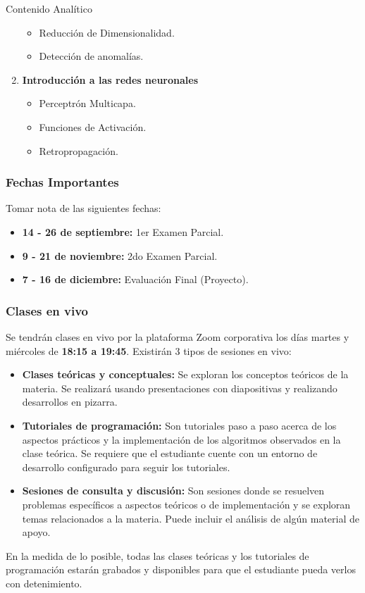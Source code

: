 \documentclass[10pt]{beamer}
\begin{document}
\begin{frame}[allowframebreaks]{Contenido Analítico}
\begin{enumerate}
\begin{itemize}
                \item Reducción de Dimensionalidad.
                \item Detección de anomalías.
            \end{itemize}
        \item  \textbf{Introducción a las redes neuronales}
            \begin{itemize}
                \item Perceptrón Multicapa.
                \item Funciones de Activación.
                \item Retropropagación.
            \end{itemize}
    \end{enumerate}
\end{frame}

\begin{frame}
    \frametitle{Fechas Importantes}
    Tomar nota de las siguientes fechas:
    \begin{itemize}
        \item \alert{\textbf{14 - 26 de septiembre:}} 1er Examen Parcial.
        \item \alert{\textbf{9 - 21 de noviembre:}} 2do Examen Parcial.
        \item \alert{\textbf{7 - 16 de diciembre:}} Evaluación Final (Proyecto).
    \end{itemize}
    

\end{frame}

\begin{frame}
    \frametitle{Clases en vivo}
    Se tendrán clases en vivo por la plataforma Zoom corporativa los días 
    \alert{martes} y \alert{miércoles} de \textbf{18:15 a 19:45}. Existirán 3 tipos 
    de sesiones en vivo:
    \begin{itemize}
        \item \textbf{Clases teóricas y conceptuales:} Se exploran los conceptos teóricos de la materia. Se realizará usando presentaciones con diapositivas y realizando desarrollos en pizarra.
        \item \textbf{Tutoriales de programación:} Son tutoriales paso a paso acerca de los aspectos prácticos y la implementación de los algoritmos observados en la clase teórica. Se requiere que el estudiante cuente con un entorno de desarrollo configurado para seguir los tutoriales.
        \item \textbf{Sesiones de consulta y discusión:} Son sesiones donde se resuelven problemas específicos a aspectos teóricos o de implementación y se exploran temas relacionados a la materia. Puede incluir el análisis de algún material de apoyo.
    \end{itemize}

    En la medida de lo posible, todas las clases teóricas y los tutoriales de programación estarán grabados y disponibles para que el estudiante pueda verlos con detenimiento.

\end{frame}
\end{document}
